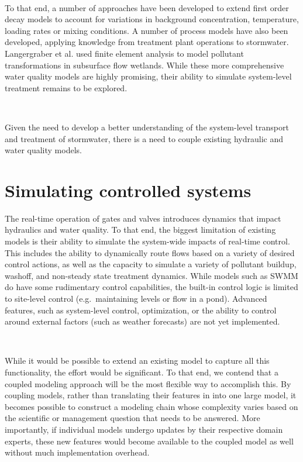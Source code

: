 \

To that end, a number of approaches have been developed to extend first order decay models to account for variations in background concentration\cite{Shepherd2001Time-DependentConstr}, temperature\cite{Kadlec2008TreatmentWetlands}, loading rates\cite{Mitchell2001AlternativeKinetics} or mixing conditions\cite{Persson2003HowPonds,Wong2006ModellingApproach}. A number of process models have also been developed, applying knowledge from treatment plant operations to stormwater\cite{Langergraber2008ModelingReview}. Langergraber et al.\cite{Langergraber2009CWM1:Wetlands,NterLangergraber2005ModelingWetlands} used finite element analysis to model pollutant transformations in  subsurface flow wetlands. While these more comprehensive water quality models are highly promising, their ability to simulate system-level treatment remains to be explored.

\

Given the need to develop a better understanding of the system-level transport and treatment of stormwater, there is a need to couple existing hydraulic and water quality models. 



\section{Simulating controlled systems}
The real-time operation of gates and valves introduces dynamics that impact hydraulics and water quality.
To that end, the biggest limitation of existing models is their ability to simulate the system-wide impacts of real-time control.
This includes the ability to dynamically route flows based on a variety of desired control actions, as well as the capacity to simulate a variety of pollutant buildup, washoff, and non-steady state treatment dynamics. 
While models such as SWMM do have some rudimentary control capabilities, the built-in control logic is limited to site-level control (e.g.\ maintaining levels or flow in a pond)\cite{Rossman2010Storm5.1}.
Advanced features, such as system-level control, optimization, or the ability to control around external factors (such as weather forecasts) are not yet implemented\cite{Riano-Briceno2016MatSWMMSystems}. 

\

While it would be possible to extend an existing model to capture all this functionality, the effort would be significant. To that end, we contend that a coupled modeling approach\cite{Goodall2011ModelingParadigm}  will be the most flexible way to accomplish this. By coupling models, rather than translating their features in  into one large model, it becomes possible to construct a modeling chain whose complexity varies based on the scientific or management question that needs to be answered. More importantly, if individual models undergo updates by their respective domain experts, these new features would become available to the coupled model as well without much implementation overhead. 

